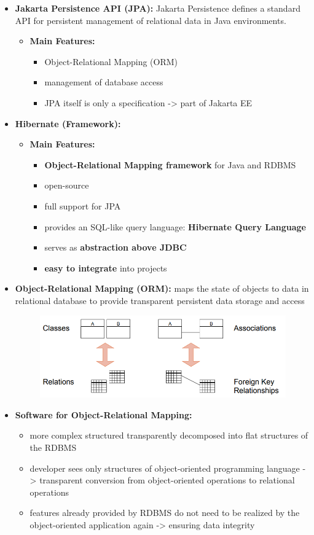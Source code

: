 \documentclass[ieeetran]{article}
\begin{document}
\begin{itemize}
\item \textbf{Jakarta Persistence API (JPA):} Jakarta Persistence defines a standard API for persistent management of relational data in Java environments.
	\begin{itemize}
	  \item \textbf{Main Features:}
		  \begin{itemize}
		    \item Object-Relational Mapping (ORM)
		\item management of database access
	\item JPA itself is only a specification -> part of Jakarta EE
		  \end{itemize}
	\end{itemize}

\item \textbf{Hibernate (Framework):}
	\begin{itemize}
	  \item \textbf{Main Features:}
		  \begin{itemize}
		    \item \textbf{Object-Relational Mapping framework} for Java and RDBMS
		\item open-source
		\item full support for JPA
		\item provides an SQL-like query language: \textbf{Hibernate Query Language}
		\item serves as \textbf{abstraction above JDBC}
		\item \textbf{easy to integrate} into projects
		  \end{itemize}
	\end{itemize}
\pagebreak
\item \textbf{Object-Relational Mapping (ORM):} maps the state of objects to data in relational database to provide transparent persistent data storage and access
	\begin{figure}[h!]
	  \centering
	  \includegraphics[width=0.5\linewidth]{orm.png}
	  \label{fig:orm_png}
	\end{figure}

\item \textbf{Software for Object-Relational Mapping:}
	\begin{itemize}
\item more complex structured transparently decomposed into flat structures of the RDBMS
\item developer sees only structures of object-oriented programming language -> transparent conversion from object-oriented operations to relational operations
	\item features already provided by RDBMS do not need to be realized by the object-oriented application again -> ensuring data integrity
	\end{itemize}


\end{itemize}
\end{document}
